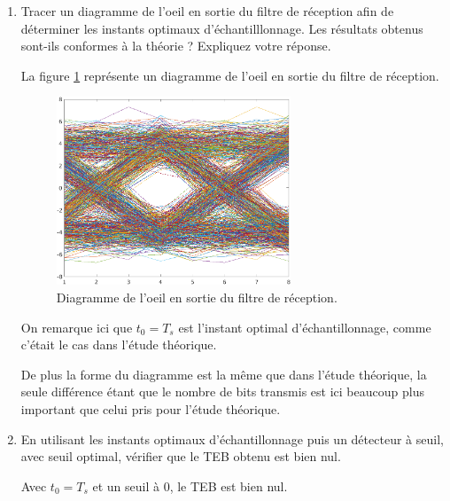 \documentclass[frenchb]{article}
\begin{document}
\begin{enumerate}
\begin{enumerate}
                \item Tracer un diagramme de l'oeil en sortie du filtre de réception afin de déterminer les instants optimaux d'échantilllonnage. Les résultats obtenus sont-ils conformes à la théorie ? Expliquez votre réponse.
                \par\leavevmode\par
       			 \setlength\parindent{0.5cm}
        		 La figure \ref{fig : C1F2} représente  un diagramme de l'oeil en sortie du filtre de réception.
        
                 \begin{figure}[ht!]
		         \centering
		         \includegraphics[width=7cm]{C1F2.png}		              			     \caption{Diagramme de l'oeil en sortie du filtre de réception. \label{fig : C1F2}}
		         \end{figure}
		        
				 On remarque ici que $t_0 = T_s$ est l'instant optimal d'échantillonnage, comme c'était le cas dans l'étude théorique. 
				 
				 De plus la forme du diagramme est la même que dans l'étude théorique, la seule différence étant que le nombre de bits transmis  est ici beaucoup plus important que celui pris pour l'étude théorique. 
				\par\leavevmode\par
                \item En utilisant les instants optimaux d'échantillonnage puis un détecteur à seuil, avec seuil optimal, vérifier que le TEB obtenu est bien nul.
                 \par\leavevmode\par
       			 \setlength\parindent{0.5cm}
       			 Avec $t_0 = T_s$ et un seuil à $0$, le TEB est bien nul. 
       		     \par\leavevmode\par	 
            \end{enumerate}
            

\end{enumerate}
\end{document}
